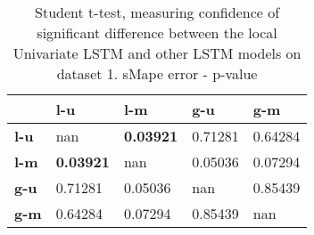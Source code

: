 \begin{table}[h]
\centering
\caption{Student t-test, measuring confidence of significant difference between the local Univariate LSTM and other LSTM models on dataset 1. sMape error - p-value}
\label{table:ttest-p-values-lstm-experiments-sMAPE-dataset-1}
\begin{tabular}{lllll}
\toprule
{} &               l-u &               l-m &      g-u &      g-m \\
\midrule
\textbf{l-u} &               nan &  \textbf{0.03921} &  0.71281 &  0.64284 \\
\textbf{l-m} &  \textbf{0.03921} &               nan &  0.05036 &  0.07294 \\
\textbf{g-u} &           0.71281 &           0.05036 &      nan &  0.85439 \\
\textbf{g-m} &           0.64284 &           0.07294 &  0.85439 &      nan \\
\bottomrule
\end{tabular}
\end{table}
